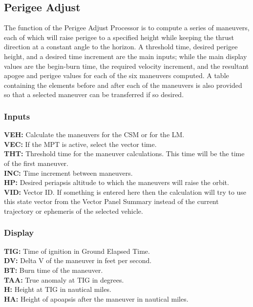 \documentclass[11pt]{article} %
\begin{document}
\newpage
\subsection{Perigee Adjust}
The function of the Perigee Adjust Processor is to compute a series of maneuvers, each of which will raise perigee to a specified height while keeping the thrust direction at a constant angle to the horizon. A threshold time, desired perigee height, and a desired time increment are the main inputs; while the main display values are the begin-burn time, the required velocity increment, and the resultant apogee and perigee values for each of the six maneuvers computed. A table containing the elements before and after each of the maneuvers is also provided so that a selected maneuver can be transferred if so desired.\\
\subsubsection{Inputs}
\textbf{VEH:} Calculate the maneuvers for the CSM or for the LM.\\
\textbf{VEC:} If the MPT is active, select the vector time.\\
\textbf{THT:} Threshold time for the maneuver calculations. This time will be the time of the first maneuver.\\
\textbf{INC:} Time increment between maneuvers.\\
\textbf{HP:} Desired periapsis altitude to which the maneuvers will raise the orbit.\\
\textbf{VID:} Vector ID. If something is entered here then the calculation will try to use this state vector from the Vector Panel Summary instead of the current trajectory or ephemeris of the selected vehicle.\\
\subsubsection{Display}
\textbf{TIG:} Time of ignition in Ground Elapsed Time.\\
\textbf{DV:} Delta V of the maneuver in feet per second.\\
\textbf{BT:} Burn time of the maneuver.\\
\textbf{TAA:} True anomaly at TIG in degrees.\\
\textbf{H:} Height at TIG in nautical miles.\\
\textbf{HA:} Height of apoapsis after the maneuver in nautical miles.\\
\newpage
\end{document}
